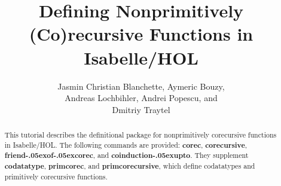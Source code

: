 \documentclass[12pt,a4paper]{article} %
\title{%
Defining Nonprimitively (Co)recursive Functions in Isabelle/HOL}
\author{Jasmin Christian Blanchette, Aymeric Bouzy, \\
Andreas Lochbihler, Andrei Popescu, and \\
Dmitriy Traytel}
\renewcommand\_{\hbox{\textunderscore\kern-.05ex}}
\newcommand{\keyw}[1]{\textbf{#1}}
\begin{document}
\maketitle

\begin{sloppy}
\begin{abstract}
\noindent
This tutorial describes the definitional package for nonprimitively corecursive functions
in Isabelle/HOL. The following commands are provided:
\keyw{corec}, \keyw{corecursive}, \keyw{friend\_of\_corec}, and \keyw{coinduction\_\allowbreak upto}.
They supplement \keyw{codatatype}, \keyw{primcorec}, and \keyw{primco\-rec\-ur\-sive}, which
define codatatypes and primitively corecursive functions.
\end{abstract}
\end{sloppy}

\tableofcontents



\let\em=\sl
{}

\end{document}
